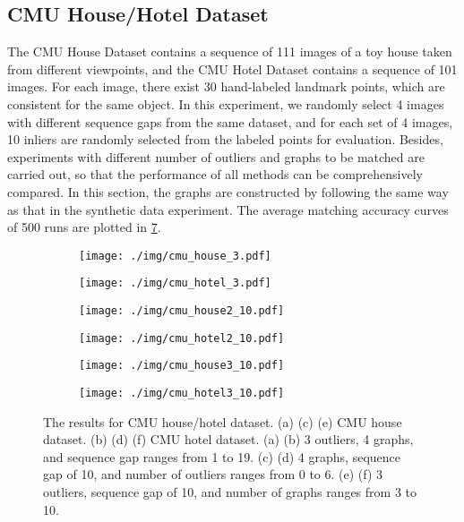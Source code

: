 \subsection{CMU House/Hotel Dataset}

The CMU House Dataset contains a sequence of 111 images of a toy house taken from different viewpoints, and the CMU Hotel Dataset contains a sequence of 101 images. For each image, there exist 30 hand-labeled landmark points, which are consistent for the same object.  In this experiment, we randomly select 4 images with different sequence gaps from the same dataset, and for each set of 4 images, 10 inliers are randomly selected from the labeled points for evaluation. Besides, experiments with different number of outliers and graphs to be matched are carried out, so that the performance of all methods can be comprehensively compared. In this section, the graphs are constructed by following the same way as that in the synthetic data experiment. The average matching accuracy curves of 500 runs are plotted in \cref{fig:5.5}.

\begin{figure}[htb!]
    \centering
    \begin{subfigure}{.23\textwidth}
        \centering
        \texttt{[image: ./img/cmu\_house\_3.pdf]}
        \caption{}
        \label{fig:5.5.1}
    \end{subfigure}
    \begin{subfigure}{.23\textwidth}
        \centering
        \texttt{[image: ./img/cmu\_hotel\_3.pdf]}
        \caption{}
        \label{fig:5.6.1}
    \end{subfigure}
    \begin{subfigure}{.23\textwidth}
        \centering
        \texttt{[image: ./img/cmu\_house2\_10.pdf]}
        \caption{}
        \label{fig:5.5.2}
    \end{subfigure}
    \begin{subfigure}{.23\textwidth}
        \centering
        \texttt{[image: ./img/cmu\_hotel2\_10.pdf]}
        \caption{}
        \label{fig:5.6.2}
    \end{subfigure}
    \begin{subfigure}{.23\textwidth}
        \centering
        \texttt{[image: ./img/cmu\_house3\_10.pdf]}
        \caption{}
        \label{fig:5.5.3}
    \end{subfigure}
    \begin{subfigure}{.23\textwidth}
        \centering
        \texttt{[image: ./img/cmu\_hotel3\_10.pdf]}
        \caption{}
        \label{fig:5.6.3}
    \end{subfigure}
    \caption{The results for CMU house/hotel dataset. (a) (c) (e) CMU house dataset. (b) (d) (f) CMU hotel dataset. (a) (b) 3 outliers, 4 graphs, and sequence gap ranges from 1 to 19. (c) (d) 4 graphs, sequence gap of 10, and number of outliers ranges from 0 to 6. (e) (f) 3 outliers, sequence gap of 10, and number of graphs ranges from 3 to 10.}
    \label{fig:5.5}
\end{figure}

